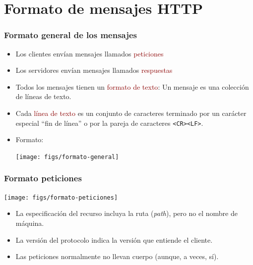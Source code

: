 \documentclass[hyperref={pdfpagelabels=true},ucs]{beamer}
\newcommand{\res}[1]{\textcolor{darkred}{#1}}
\begin{document}
\section{Formato de mensajes HTTP}



\begin{frame}[fragile, shrink=25]
\frametitle{Formato general de los mensajes}


\begin{itemize}

\item Los clientes envían mensajes llamados \res{peticiones}
\item Los servidores envían mensajes llamados \res{respuestas}
\item Todos los mensajes tienen un \res{formato de texto}: Un mensaje es una
  colección de líneas de texto.
\item Cada \res{línea de texto} es un conjunto de caracteres terminado
  por un carácter especial ``fin de línea'' o por la pareja de
  caracteres \verb|<CR><LF>|.

\item Formato:

\vspace{-5mm}
\begin{center}
\texttt{[image: figs/formato-general]}
\end{center}

\end{itemize}

\end{frame}




\begin{frame}[fragile]
\frametitle{Formato peticiones}

\begin{center}
\texttt{[image: figs/formato-peticiones]}
\end{center}


\begin{itemize}

\item La especificación del recurso incluya la ruta (\emph{path}),
  pero no el nombre de máquina.
\item La versión del protocolo indica la versión que entiende el
  cliente.
\item Las peticiones normalmente no llevan cuerpo (aunque, a veces, sí).
\end{itemize}

\end{frame}
\end{document}
